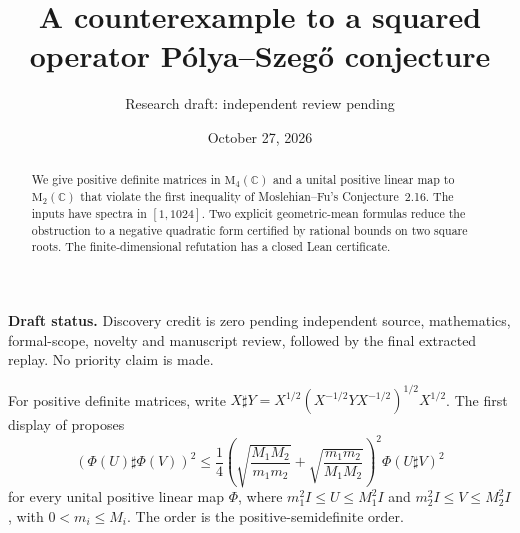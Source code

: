 \documentclass[11pt]{article}
\title{A counterexample to a squared operator P\'olya--Szeg\H{o} conjecture}
\author{Research draft: independent review pending}
\date{October 27, 2026}
\newcommand{\M}{\mathrm{M}}
\begin{document}
\maketitle
\begin{abstract}
We give positive definite matrices in $\M_4(\mathbb C)$ and a unital positive
linear map to $\M_2(\mathbb C)$ that violate the first inequality of
Moslehian--Fu's Conjecture~2.16. The inputs have spectra in $[1,1024]$.
Two explicit geometric-mean formulas reduce the obstruction to a negative
quadratic form certified by rational bounds on two square roots.
The finite-dimensional refutation has a closed Lean certificate.
\end{abstract}
\noindent\textbf{Draft status.} Discovery credit is zero pending independent
source, mathematics, formal-scope, novelty and manuscript review, followed by
the final extracted replay. No priority claim is made.

For positive definite matrices, write
$X\sharp Y=X^{1/2}(X^{-1/2}YX^{-1/2})^{1/2}X^{1/2}$.
The first display of \cite[Conjecture~2.16, p.~9]{MF} proposes
\begin{equation}\label{claim}
 (\Phi(U)\sharp\Phi(V))^2\leq
 \frac14\left(\sqrt{\frac{M_1M_2}{m_1m_2}}+
 \sqrt{\frac{m_1m_2}{M_1M_2}}\right)^2\Phi(U\sharp V)^2
\end{equation}
for every unital positive linear map $\Phi$, where
$m_1^2I\leq U\leq M_1^2I$ and $m_2^2I\leq V\leq M_2^2I$,
with $0<m_i\leq M_i$. The order is the positive-semidefinite order.
\end{document}
